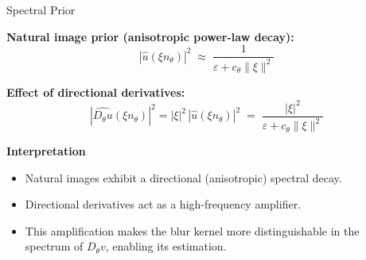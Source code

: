 \documentclass{beamer}
\begin{document}
\begin{frame}{Spectral Prior}

\small
\textbf{Natural image prior (anisotropic power-law decay):}
\[
|\widehat{u}(\xi n_\theta)|^2 
\;\approx\; 
\frac{1}{\varepsilon + c_\theta \|\xi\|^2}
\]

\textbf{Effect of directional derivatives:}
\[
|\widehat{D_\theta u}(\xi n_\theta)|^2 
= |\xi|^2 \,|\widehat{u}(\xi n_\theta)|^2
\;=\;
\frac{|\xi|^2}{\varepsilon + c_\theta \|\xi\|^2}
\]

\vspace{0.2cm}

\textbf{Interpretation}
\begin{itemize}
    \item Natural images exhibit a directional (anisotropic) spectral decay.
    \item Directional derivatives act as a high-frequency amplifier.
    \item This amplification makes the blur kernel more distinguishable  
          in the spectrum of $D_\theta v$, enabling its estimation.
\end{itemize}

\end{frame}
\end{document}
